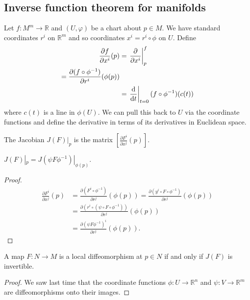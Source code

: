 \subsection{Inverse function theorem for manifolds}
Let $f : M^m \to \mathbb{R}$ and $(U, \varphi)$ be a chart about
$p \in M$. We have standard coordinates $r^i$ on $\mathbb{R}^m$
and so coordinates $x^i = r^i \circ \phi$ on $U$. Define
\begin{align*}
   \frac{\partial f}{\partial x^i}(p)
&= \left.\frac{\partial}{\partial x^i}\right|^f_p \\
 = \frac{\partial (f \circ \phi^{-1})}{\partial r^i}(\phi(p)) \\
&= \left.\frac{\mathop{}\!\mathrm{d}}{\mathop{}\!\mathrm{d} t}\right|_{t = 0} (f \circ \phi^{-1})(c(t))
\end{align*}
where $c(t)$ is a line in $\phi(U)$. We can pull this back to $U$ via the
coordinate functions and define the derivative in terms of its
derivatives in Euclidean space.

\begin{defn}[Jacobian]
The Jacobian $J(F)|_p$ is the matrix
$\left[\frac{\partial F^i}{\partial x^j}(p)\right]$.
\end{defn}

\begin{prop}
$J(F)|_p = J(\psi F \phi^{-1})|_{\phi(p)}$.
\end{prop}

\begin{proof}
  \begin{align*}
     \frac{\partial F^i}{\partial x^j}(p)
  &= \frac{\partial (F^i \circ \phi^{-1})}{\partial r^j}(\phi(p))
   = \frac{\partial (y^i \circ F \circ \phi^{-1})}
          {\partial r^j}(\phi(p)) \\
  &= \frac{\partial (r^i \circ (\psi \circ F \circ \phi^{-1}))}
          {\partial r^j}(\phi(p)) \\
  &= \frac{\partial (\psi F \phi^{-1})^i}
          {\partial r^j}(\phi(p)).
  \end{align*}
\end{proof}

\begin{corol}
A map $F: N \to M$ is a local diffeomorphism at $p \in N$ if and only
if $J(F)$ is invertible.
\end{corol}

\begin{proof}
  We saw last time that the coordinate functions $\phi : U \to \mathbb{R}^n$ and
  $\psi : V \to \mathbb{R}^m$ are diffeomorphisms onto their images.
\end{proof}
